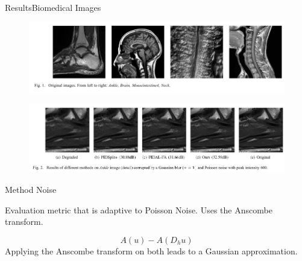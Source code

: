 \documentclass{beamer}
\begin{document}
\begin{frame}{Results}{Biomedical Images}
\begin{figure}
    \centering
    \includegraphics[scale=0.55]{Result_OriginalImages.PNG}
\end{figure}

\begin{figure}
    \centering
    \includegraphics[scale=0.55]{Result_Ankle.PNG}
\end{figure}

\end{frame}

\begin{frame}{Method Noise}

Evaluation metric that is adaptive to Poisson Noise. Uses the Anscombe transform. 

\[
A(u) - A(D_h u)
\]
Applying the Anscombe transform on both leads to a Gaussian approximation.
\end{frame}
\end{document}
